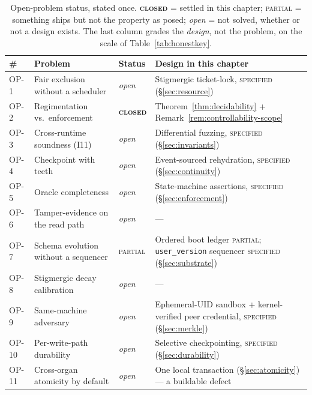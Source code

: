 \documentclass[11pt,a4paper]{article}
\newcommand{\BuiltWeak}{{\textcolor{hhink}{\textsc{partial}}}}
\newcommand{\Designed}{{\textcolor{hhgray}{\textsc{specified}}}}
\newcommand{\Closed}{{\textcolor{hhink}{\textsc{\textbf{closed}}}}}
\newcommand{\Partial}{{\textcolor{hhink}{\textsc{partial}}}}
\newcommand{\Open}{{\textcolor{hhgray}{\textit{open}}}}
\theoremstyle{definition}
\theoremstyle{remark}
\begin{document}
\renewcommand{\arraystretch}{1.2}
\begin{table}[H]
\centering
\caption{Open-problem status, stated once. \Closed{} = settled in this chapter;
\Partial{} = something ships but not the property as posed; \Open{} = not solved,
whether or not a design exists. The last column grades the \emph{design}, not the
problem, on the scale of Table~\ref{tab:honestkey}.}
\label{tab:op-status}
\small
\begin{tabularx}{\textwidth}{@{}p{} >{\raggedright\arraybackslash}X >{\raggedright\arraybackslash}p{} >{\raggedright\arraybackslash}p{}@{}}
\toprule
\textbf{\#} & \textbf{Problem} & \textbf{Status} & \textbf{Design in this chapter} \\
\midrule
OP-1 & Fair exclusion without a scheduler & \Open & Stigmergic ticket-lock, \Designed{} (\S\ref{sec:resource}) \\
OP-2 & Regimentation vs.\ enforcement & \Closed & Theorem~\ref{thm:decidability} + Remark~\ref{rem:controllability-scope} \\
OP-3 & Cross-runtime soundness (I11) & \Open & Differential fuzzing, \Designed{} (\S\ref{sec:invariants}) \\
OP-4 & Checkpoint with teeth & \Open & Event-sourced rehydration, \Designed{} (\S\ref{sec:continuity}) \\
OP-5 & Oracle completeness & \Open & State-machine assertions, \Designed{} (\S\ref{sec:enforcement}) \\
OP-6 & Tamper-evidence on the read path & \Open & --- \\
OP-7 & Schema evolution without a sequencer & \Partial & Ordered boot ledger \BuiltWeak; \texttt{user\_version} sequencer \Designed{} (\S\ref{sec:substrate}) \\
OP-8 & Stigmergic decay calibration & \Open & --- \\
OP-9 & Same-machine adversary & \Open & Ephemeral-UID sandbox + kernel-verified peer credential, \Designed{} (\S\ref{sec:merkle}) \\
OP-10 & Per-write-path durability & \Open & Selective checkpointing, \Designed{} (\S\ref{sec:durability}) \\
OP-11 & Cross-organ atomicity by default & \Open & One local transaction (\S\ref{sec:atomicity}) --- a buildable defect \\
\bottomrule
\end{tabularx}
\end{table}
\end{document}
